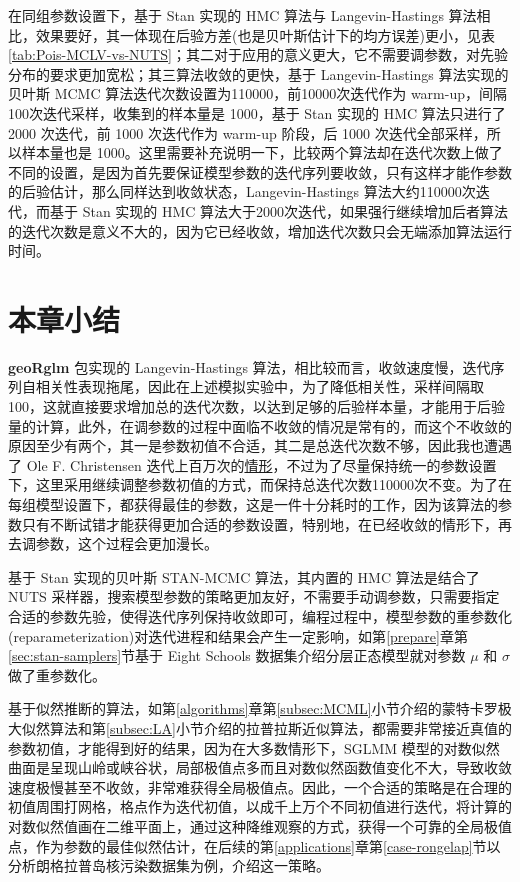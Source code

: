 \documentclass[12pt,a4paper,UTF8,twoside]{book}
\theoremstyle{definition}
\theoremstyle{definition}
\theoremstyle{definition}
\theoremstyle{remark}
\begin{document}
在同组参数设置下，基于 Stan 实现的 HMC 算法与 Langevin-Hastings
算法相比，效果要好，其一体现在后验方差(也是贝叶斯估计下的均方误差)更小，见表
\ref{tab:Pois-MCLV-vs-NUTS}；其二对于应用的意义更大，它不需要调参数，对先验分布的要求更加宽松；其三算法收敛的更快，基于
Langevin-Hastings 算法实现的贝叶斯 MCMC
算法迭代次数设置为110000，前10000次迭代作为
warm-up，间隔100次迭代采样，收集到的样本量是 1000，基于 Stan 实现的 HMC
算法只进行了 2000 次迭代，前 1000 次迭代作为 warm-up 阶段，后 1000
次迭代全部采样，所以样本量也是
1000。这里需要补充说明一下，比较两个算法却在迭代次数上做了不同的设置，是因为首先要保证模型参数的迭代序列要收敛，只有这样才能作参数的后验估计，那么同样达到收敛状态，Langevin-Hastings
算法大约110000次迭代，而基于 Stan 实现的 HMC
算法大于2000次迭代，如果强行继续增加后者算法的迭代次数是意义不大的，因为它已经收敛，增加迭代次数只会无端添加算法运行时间。

\hypertarget{sec:simulations}{%
\section{本章小结}\label{sec:simulations}}

\textbf{geoRglm} 包实现的 Langevin-Hastings
算法，相比较而言，收敛速度慢，迭代序列自相关性表现拖尾，因此在上述模拟实验中，为了降低相关性，采样间隔取100，这就直接要求增加总的迭代次数，以达到足够的后验样本量，才能用于后验量的计算，此外，在调参数的过程中面临不收敛的情况是常有的，而这个不收敛的原因至少有两个，其一是参数初值不合适，其二是总迭代次数不够，因此我也遭遇了
Ole F. Christensen
迭代上百万次的\href{http://gbi.agrsci.dk/~ofch/geoRglm/Intro/books.html}{情形}，不过为了尽量保持统一的参数设置下，这里采用继续调整参数初值的方式，而保持总迭代次数110000次不变。为了在每组模型设置下，都获得最佳的参数，这是一件十分耗时的工作，因为该算法的参数只有不断试错才能获得更加合适的参数设置，特别地，在已经收敛的情形下，再去调参数，这个过程会更加漫长。

基于 Stan 实现的贝叶斯 STAN-MCMC 算法，其内置的 HMC 算法是结合了 NUTS
采样器\citep{hoffman2014}，搜索模型参数的策略更加友好，不需要手动调参数，只需要指定合适的参数先验，使得迭代序列保持收敛即可，编程过程中，模型参数的重参数化(reparameterization)对迭代进程和结果会产生一定影响，如第\ref{prepare}章第\ref{sec:stan-samplers}节基于
Eight Schools 数据集介绍分层正态模型就对参数 \(\mu\) 和 \(\sigma\)
做了重参数化。

基于似然推断的算法，如第\ref{algorithms}章第\ref{subsec:MCML}小节介绍的蒙特卡罗极大似然算法和第\ref{subsec:LA}小节介绍的拉普拉斯近似算法，都需要非常接近真值的参数初值，才能得到好的结果，因为在大多数情形下，SGLMM
模型的对数似然曲面是呈现山岭或峡谷状，局部极值点多而且对数似然函数值变化不大，导致收敛速度极慢甚至不收敛，非常难获得全局极值点。因此，一个合适的策略是在合理的初值周围打网格，格点作为迭代初值，以成千上万个不同初值进行迭代，将计算的对数似然值画在二维平面上，通过这种降维观察的方式，获得一个可靠的全局极值点，作为参数的最佳似然估计，在后续的第\ref{applications}章第\ref{case-rongelap}节以分析朗格拉普岛核污染数据集为例，介绍这一策略。
\end{document}
